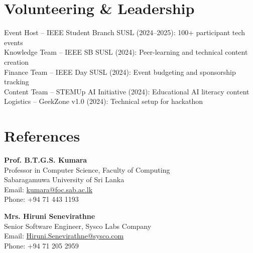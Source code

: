 \documentclass[letterpaper,11.8pt]{article}
\begin{document}
\section{Volunteering \& Leadership}
\vspace{-1pt}

Event Host – IEEE Student Branch SUSL (2024–2025): 100+ participant tech events\\
Knowledge Team – IEEE SB SUSL (2024): Peer-learning and technical content creation\\
Finance Team – IEEE Day SUSL (2024): Event budgeting and sponsorship tracking\\
Content Team – STEMUp AI Initiative (2024): Educational AI literacy content\\
Logistics – GeekZone v1.0 (2024): Technical setup for hackathon

\vspace{-2pt}
\section{References}
\vspace{-1pt}

\textbf{Prof. B.T.G.S. Kumara}\\
Professor in Computer Science, Faculty of Computing\\
Sabaragamuwa University of Sri Lanka\\
Email: \href{mailto:kumara@foc.sab.ac.lk}{kumara@foc.sab.ac.lk}\\
Phone: +94 71 443 1193

\vspace{6pt}
\noindent\textbf{Mrs. Hiruni Senevirathne}\\
Senior Software Engineer, Sysco Labs Company\\
Email: \href{mailto:Hiruni.Senevirathne@sysco.com}{Hiruni.Senevirathne@sysco.com}\\
Phone: +94 71 205 2959
\end{document}
